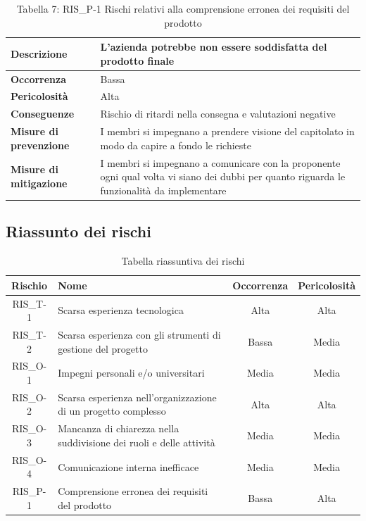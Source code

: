 \documentclass[a4paper,10pt]{article}
\begin{document}
\begin{table}[H]
\centering
\renewcommand{\arraystretch}{1.3}

\begin{tabularx}{\textwidth}{|p{4cm}|X|}
\hline
\textbf{Descrizione} & 
L'azienda potrebbe non essere soddisfatta del prodotto finale \\ \hline

\textbf{Occorrenza} & Bassa \\ \hline

\textbf{Pericolosità} & Alta \\ \hline

\textbf{Conseguenze} & 
Rischio di ritardi nella consegna e valutazioni negative \\ \hline

\textbf{Misure di prevenzione} & I membri si impegnano a prendere visione del capitolato in modo da capire a fondo le richieste \\ \hline

\textbf{Misure di mitigazione} &
I membri si impegnano a comunicare con la proponente ogni qual volta vi siano dei dubbi per quanto riguarda le funzionalità da implementare \\ \hline

\end{tabularx}

\caption{Tabella 7: RIS\_P-1 Rischi relativi alla comprensione erronea dei requisiti del prodotto}
\end{table}

\subsection{Riassunto dei rischi}

\begin{table}[H]
\centering
\begin{tabular}{|c|p{6cm}|c|c|}
\hline
\textbf{Rischio} & \textbf{Nome} & \textbf{Occorrenza} & \textbf{Pericolosità} \\
\hline
RIS\_T-1 & Scarsa esperienza tecnologica & Alta & Alta \\
\hline
RIS\_T-2 & Scarsa esperienza con gli strumenti di gestione del progetto & Bassa & Media \\
\hline
RIS\_O-1 & Impegni personali e/o universitari & Media & Media \\
\hline
RIS\_O-2 & Scarsa esperienza nell’organizzazione di un progetto complesso & Alta & Alta \\
\hline
RIS\_O-3 & Mancanza di chiarezza nella suddivisione dei ruoli e delle attività & Media & Media \\
\hline
RIS\_O-4 & Comunicazione interna inefficace & Media & Media \\
\hline
RIS\_P-1 & Comprensione erronea dei requisiti del prodotto & Bassa & Alta \\
\hline
\end{tabular}
\caption{Tabella riassuntiva dei rischi}
\end{table}
\end{document}
